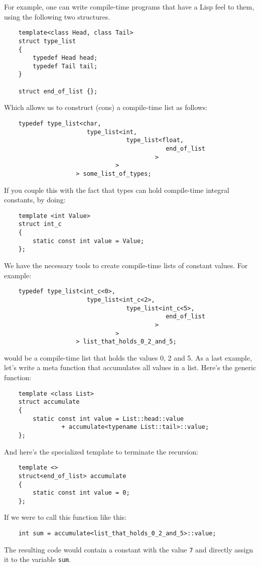 \documentclass[10pt]{article}
\begin{document}
For example, one can write compile-time programs that have a Lisp feel to them, using the following two structures.
\begin{verbatim}
    template<class Head, class Tail>
    struct type_list
    {
        typedef Head head;
        typedef Tail tail;
    }

    struct end_of_list {};
\end{verbatim}
Which allows us to construct (cons) a compile-time list as follows:
\begin{verbatim}
    typedef type_list<char,
                       type_list<int,
                                  type_list<float,
                                             end_of_list
                                          >
                               >
                    > some_list_of_types;
\end{verbatim}
If you couple this with the fact that types can hold compile-time
integral constants, by doing:
\begin{verbatim}
    template <int Value>
    struct int_c
    {
        static const int value = Value;
    };
\end{verbatim}
We have the necessary tools to create compile-time lists of
constant values. For example:
\begin{verbatim}
    typedef type_list<int_c<0>,
                       type_list<int_c<2>,
                                  type_list<int_c<5>,
                                             end_of_list
                                          >
                               >
                    > list_that_holds_0_2_and_5;
\end{verbatim}
would be a compile-time list that holds the values 0, 2 and 5. As
a last example, let's write a meta function that accumulates all
values in a list. Here's the generic function:

\begin{verbatim}
    template <class List>
    struct accumulate
    {
        static const int value = List::head::value
                + accumulate<typename List::tail>::value;
    };
\end{verbatim}
And here's the specialized template to terminate the recursion:
\begin{verbatim}
    template <>
    struct<end_of_list> accumulate
    {
        static const int value = 0;
    };
\end{verbatim}
If we were to call this function like this:
\begin{verbatim}
    int sum = accumulate<list_that_holds_0_2_and_5>::value;
\end{verbatim}
The resulting code would contain a constant with the value
\verb"7" and directly assign it to the variable \verb"sum".
\end{document}
